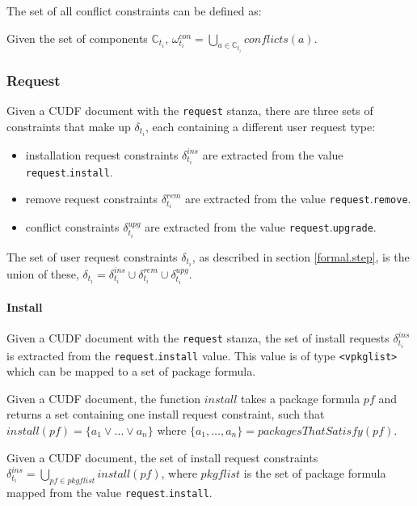 The set of all conflict constraints can be defined as:
\begin{defs}
Given the set of components $\mathbb{C}_{t_i}$,
$\omega_{t_i}^{con} = \bigcup \limits_{a\in \mathbb{C}_{t_i}} conflicts(a)$.
\end{defs} 

\subsubsection{Request}
\label{formal.cudf.request}
Given a CUDF document with the \texttt{request} stanza, there are three sets of constraints that make up $\delta_{t_i}$, each containing a different user request type:
\begin{itemize}
  \item installation request constraints $\delta_{t_i}^{ins}$ are extracted from the value \texttt{request}.\texttt{install}.
  \item remove request constraints  $\delta_{t_i}^{rem}$ are extracted from the value \texttt{request}.\texttt{remove}.
  \item conflict  constraints $\delta_{t_i}^{upg}$ are extracted from the value \texttt{request}.\texttt{upgrade}.
\end{itemize}
The set of user request constraints $\delta_{t_i}$, as described in section \ref{formal.step}, is the union of these,
$\delta_{t_i} =  \delta_{t_i}^{ins} \cup \delta_{t_i}^{rem} \cup \delta_{t_i}^{upg}$.

\paragraph{Install}
Given a CUDF document with the \texttt{request} stanza, the set of install requests $\delta_{t_i}^{ins}$ is extracted from the \texttt{request}.\texttt{install} value.
This value is of type \texttt{<vpkglist>} which can be mapped to a set of package formula.
\begin{defs}
Given a CUDF document, 
the function $install$ takes a package formula $pf$ and returns a set containing one install request constraint, 
such that $install(pf) = \{a_1 \vee \ldots \vee a_n\}$ where $\{a_1,\ldots,a_n\} = packagesThatSatisfy(pf)$.
\end{defs}

\begin{defs}
Given a CUDF document, the set of install request constraints $\delta_{t_i}^{ins} = \bigcup \limits_{pf \in pkgflist} install(pf)$, 
where $pkgflist$ is the set of package formula mapped from the value \texttt{request}.\texttt{install}.
\end{defs}

